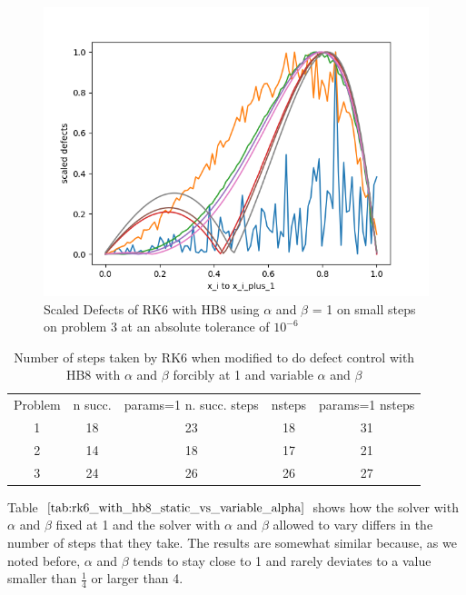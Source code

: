 \documentclass{article}
\begin{document}
\begin{figure}[H]
\centering
\includegraphics[width=0.7\linewidth]{./figures/static_alpha_rk6_with_hb8_p3_scaled_defects_small_steps}
\caption{Scaled Defects of RK6 with HB8 using $\alpha$ and $\beta$ = 1 on small steps on problem 3 at an absolute tolerance of $10^{-6}$}
\label{fig:static_alpha_rk6_with_hb8_p3_scaled_defects_small_steps}
\end{figure}

\begin{table}[h]
\caption {Number of steps taken by RK6 when modified to do defect control with HB8 with $\alpha$ and $\beta$ forcibly at 1 and variable $\alpha$ and $\beta$} \label{tab:rk6_with_hb6_vs_hb8_static_vs_variable}
\begin{center}
\begin{tabular}{ c c c c c } 
Problem & n succ. & params=1 n. succ. steps & nsteps & params=1 nsteps \\ 
1       & 18                      &        23               & 18         & 31\\ 
2       & 14                      &        18               & 17         & 21\\
3       & 24                      &        26               & 26         & 27\\
\end{tabular}
\end{center}
\end{table}	

Table $\ref{tab:rk6_with_hb8_static_vs_variable_alpha}$ shows how the solver with $\alpha$ and $\beta$ fixed at 1 and the solver with $\alpha$ and $\beta$ allowed to vary differs in the number of steps that they take. The results are somewhat similar because, as we noted before, $\alpha$ and $\beta$ tends to stay close to 1 and rarely deviates to a value smaller than $\frac{1}{4}$ or larger than 4.
\end{document}
